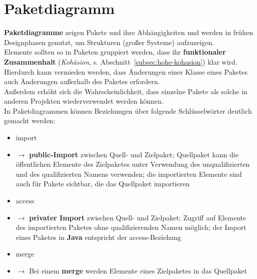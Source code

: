 \section{Paketdiagramm}

\begin{tcolorbox}[title=Komposition]
    \textbf{Paketdiagramme} zeigen Pakete und ihre Abhängigkeiten und werden in frühen Designphasen genutzt, um Strukturen (großer Systeme) aufzuzeigen.\\

    \noindent
    Elemente sollten so in Paketen gruppiert werden, dass ihr \textbf{funktionaler Zusammenhalt} (\textit{Kohäsion}, s. Abschnitt~\ref{subsec:hohe-kohasion}) klar wird.\\
    Hierdurch kann vermieden werden, dass Änderungen einer Klasse eines Paketes auch Änderungen außerhalb des Paketes erfordern.\\
    Außerdem erhöht sich die Wahrscheinlichkeit, dass einzelne Pakete als solche in anderen Projekten wiederverwendet werden können.\\

    \noindent
    In Paketdiagrammen können Beziehungen über folgende Schlüsselwörter deutlich gemacht werden:

    \begin{itemize}
        \item \guillemotleft import\guillemotright
        \item[] $\rightarrow$ \textbf{public-Import} zwischen Quell- und Zielpaket; Quellpaket kann die öffentlichen Elemente des Zielpaketes unter Verwendung des unqualifizierten und des qualifizierten Namens verwenden; die importierten Elemente sind auch für Pakete sichtbar, die das Quellpaket importieren
        \item \guillemotleft access\guillemotright
        \item[] $\rightarrow$ \textbf{privater Import} zwischen Quell- und Zielpaket; Zugriff auf Elemente des importierten Paketes ohne qualifizierenden Namen möglich; der Import eines Paketes in \textbf{Java} entspricht der \guillemotleft access\guillemotright-Beziehung
        \item \guillemotleft merge\guillemotright
        \item[] $\rightarrow$ Bei einem \textbf{merge} werden Elemente eines Zielpaketes in das Quellpaket
   \end{itemize}
\end{tcolorbox}